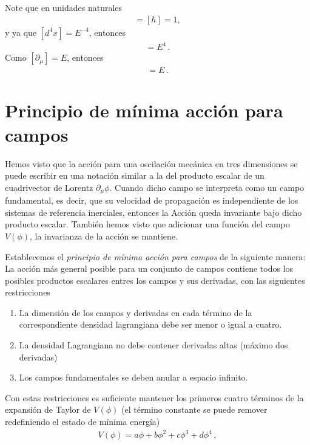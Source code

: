 Note que en unidades naturales
\begin{align}
  [S]=[\hbar]=1,
\end{align}
y ya que $[d^4x]=E^{-4}$, entonces
\begin{align}
  [\mathcal{L}]=E^{4}\,.
\end{align}
Como $[\partial_{\mu}]=E$, entonces
\begin{align}
  [\phi]=E\,.
\end{align}


 
\section{Principio de mínima acción para campos}
Hemos visto que la acción para una oscilación mecánica en tres dimensiones se puede escribir en una notación similar a la del producto escalar de un cuadrivector de Lorentz $\partial_\mu\phi$. Cuando dicho campo se interpreta como un campo fundamental, es decir, que su velocidad de propagación es independiente de los sistemas de referencia inerciales, entonces la Acción queda invariante bajo dicho producto escalar. También hemos visto que adicionar una función del campo $V(\phi)$, la invarianza de la acción se mantiene.

Establecemos el \emph{principio de mínima acción para campos} de la siguiente manera: La acción más general posible para un conjunto de campos contiene todos los posibles productos escalares entres los campos y sus derivadas, con las siguientes restricciones
\begin{enumerate}
\item La dimensión de los campos y derivadas en cada término de la correspondiente densidad lagrangiana debe ser menor o igual a cuatro.
\item La densidad Lagrangiana no debe contener derivadas altas (máximo dos derivadas)
\item Los campos fundamentales se deben anular a espacio infinito.
\end{enumerate}
Con estas restricciones es suficiente mantener los primeros cuatro términos de la expansión de Taylor de $V(\phi)$ (el término constante se puede remover redefiniendo el estado de mínima energía)
\begin{align}
  \label{eq:fullV}
  V(\phi)=a \phi + b\phi^2+c\phi^3+d\phi^4\,,
\end{align}

